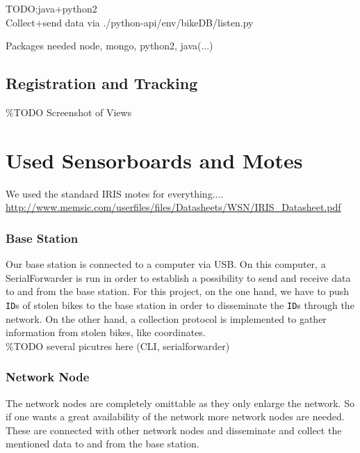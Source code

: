 \documentclass[a4paper]{article}
\begin{document}
TODO:java+python2 \\
Collect+send data via ./python-api/env/bikeDB/listen.py




Packages needed node, mongo, python2, java(...)
\subsection{Registration and Tracking}
\%TODO Screenshot of Views

\section{Used Sensorboards and Motes}
We used the standard IRIS motes for everything....
\url{http://www.memsic.com/userfiles/files/Datasheets/WSN/IRIS_Datasheet.pdf}
\subsubsection{Base Station}
Our base station is connected to a computer via USB. On this computer, a SerialForwarder is run in order to establish a possibility to send and receive data to and from the base station. For this project, on the one hand, we have to push \texttt{ID}s of stolen bikes to the base station in order to disseminate the \texttt{ID}s through the network. On the other hand, a collection protocol is implemented to gather information from stolen bikes, like coordinates.\\
\%TODO several picutres here (CLI, serialforwarder)
\subsubsection{Network Node}
The network nodes are completely omittable as they only enlarge the network. So if one wants a great availability of the network more network nodes are needed. These are connected with other network nodes and disseminate and collect the mentioned data to and from the base station.
\end{document}
